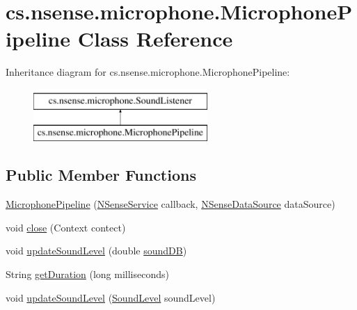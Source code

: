 \hypertarget{classcs_1_1nsense_1_1microphone_1_1_microphone_pipeline}{\section{cs.\-nsense.\-microphone.\-Microphone\-Pipeline Class Reference}
\label{classcs_1_1nsense_1_1microphone_1_1_microphone_pipeline}
}
Inheritance diagram for cs.\-nsense.\-microphone.\-Microphone\-Pipeline\-:\begin{figure}[H]
\begin{center}
\leavevmode
\includegraphics[height=2.000000cm]{classcs_1_1nsense_1_1microphone_1_1_microphone_pipeline}
\end{center}
\end{figure}
\subsection*{Public Member Functions}
\begin{DoxyCompactItemize}
\item 
\hyperlink{classcs_1_1nsense_1_1microphone_1_1_microphone_pipeline_a05bf73670250bafb29eb0b9ed4ae65cb}{Microphone\-Pipeline} (\hyperlink{classcs_1_1nsense_1_1_n_sense_service}{N\-Sense\-Service} callback, \hyperlink{classcs_1_1nsense_1_1db_1_1_n_sense_data_source}{N\-Sense\-Data\-Source} data\-Source)
\item 
void \hyperlink{classcs_1_1nsense_1_1microphone_1_1_microphone_pipeline_a2f0eb313888ffc58ea006985fe811ccd}{close} (Context contect)
\item 
void \hyperlink{classcs_1_1nsense_1_1microphone_1_1_microphone_pipeline_a966d05867237f38060ebd45ab2a01632}{update\-Sound\-Level} (double \hyperlink{classcs_1_1nsense_1_1microphone_1_1_microphone_pipeline_a925023c3a2910aaf80f77ed11ba60bfa}{sound\-D\-B})
\item 
String \hyperlink{classcs_1_1nsense_1_1microphone_1_1_microphone_pipeline_ad02858cc1d810d7bfd7f5f31f9f364bf}{get\-Duration} (long milliseconds)
\item 
void \hyperlink{classcs_1_1nsense_1_1microphone_1_1_microphone_pipeline_a41594debaaa940d6250014174b45a596}{update\-Sound\-Level} (\hyperlink{classcs_1_1nsense_1_1microphone_1_1_sound_level}{Sound\-Level} sound\-Level)
\end{DoxyCompactItemize}
